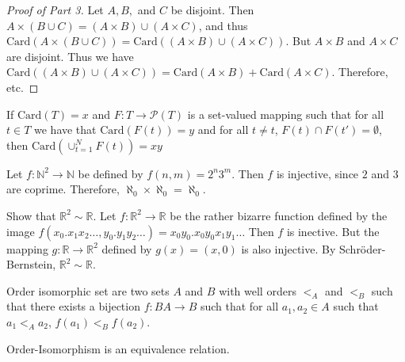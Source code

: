         \begin{proof}[Proof of Part 3]
            Let $A,B,$ and $C$ be disjoint.
            Then
            ${A}\times{({B}\cup{C})}%
             =({A}\times{B})\cup({A}\times{C})$, and thus
            $\mathrm{Card}({A}\times{({B}\cup{C})})%
             =\mathrm{Card}(({A}\times{B})\cup({A}\times{C}))$.
            But ${A}\times{B}$ and ${A}\times{C}$ are disjoint.
            Thus we have
            $\mathrm{Card}(({A}\times{B})\cup({A}\times{C}))%
             =\mathrm{Card}({A}\times{B})+\mathrm{Card}({A}\times{C})$.
            Therefore, etc.
        \end{proof}
        \begin{theorem}
            If $\mathrm{Card}(T)=x$ and
            $F:{T}\rightarrow{\mathcal{P}(T)}$
            is a set-valued mapping such that for all
            ${t}\in{T}$ we have that
            $\mathrm{Card}(F(t))=y$ and
            for all ${t}\ne{t}$,
            ${F(t)}\cap{F(t')}=\emptyset$, then
            $\mathrm{Card}(\cup_{t=1}^{N}F(t))=xy$
        \end{theorem}
        \begin{example}
            Let $f:{\mathbb{N}^{2}}\rightarrow{\mathbb{N}}$
            be defined by $f(n,m)=2^{n}3^{m}$.
            Then $f$ is injective, since $2$ and $3$
            are coprime. Therefore,
            $\aleph_{0}\times\aleph_{0}=\aleph_{0}$.
        \end{example}
        \begin{example}
            Show that $\mathbb{R}^{2}\sim\mathbb{R}$.
            Let $f:\mathbb{R}^{2}\rightarrow\mathbb{R}$
            be the rather bizarre function defined by the image
            $f(x_{0}.x_{1}x_{2}\hdots,y_{0}.y_{1}y_{2}\hdots)%
             =x_{0}y_{0}.x_{0}y_{0}x_{1}y_{1}\hdots$ Then
            $f$ is inective. But the mapping
            $g:\mathbb{R}\rightarrow\mathbb{R}^{2}$
            defined by $g(x)=(x,0)$ is also injective.
            By Schr\"{o}der-Bernstein,
            $\mathbb{R}^{2}\sim\mathbb{R}$.
        \end{example}
        \begin{definition}
           Order isomorphic set are two sets $A$ and $B$
           with well orders $<_{A}$ and $<_{B}$ such that
           there exists a bijection $f:{B}A\rightarrow{B}$
           such that for all $a_{1},a_{2}\in{A}$ such that
           $a_{1}<_{A}a_{2}$, $f(a_{1})<_{B}f(a_{2})$.
        \end{definition}
        \begin{theorem}
           Order-Isomorphism is an equivalence relation.
        \end{theorem}
